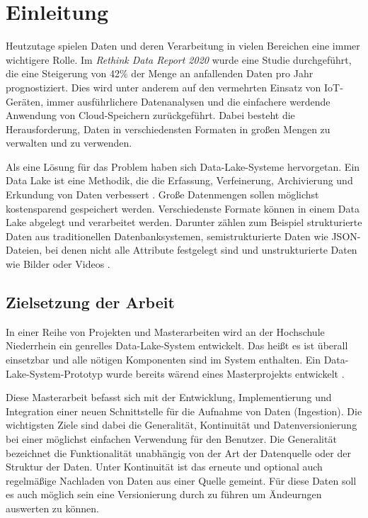 \chapter{Einleitung}

Heutzutage spielen Daten und deren Verarbeitung in vielen Bereichen eine immer wichtigere Rolle.
Im \textit{Rethink Data Report 2020} \textcite{rethink_data_2020} wurde eine Studie durchgeführt, die eine Steigerung von 42\% der Menge an anfallenden Daten pro Jahr prognostiziert.
Dies wird unter anderem auf den vermehrten Einsatz von IoT-Geräten, immer ausführlichere Datenanalysen und die einfachere werdende Anwendung von Cloud-Speichern zurückgeführt.
Dabei besteht die Herausforderung, Daten in verschiedensten Formaten in großen Mengen zu verwalten und zu verwenden.

Als eine Lösung für das Problem haben sich Data-Lake-Systeme hervorgetan.
Ein Data Lake ist eine Methodik, die die Erfassung, Verfeinerung, Archivierung und Erkundung von Daten verbessert \parencite{datalake_01}.
Große Datenmengen sollen möglichst kostensparend gespeichert werden.
Verschiedenste Formate können in einem Data Lake abgelegt und verarbeitet werden.
Darunter zählen zum Beispiel strukturierte Daten aus traditionellen Datenbanksystemen, semistrukturierte Daten wie JSON-Dateien, bei denen nicht alle Attribute festgelegt sind und unstrukturierte Daten wie Bilder oder Videos \parencite{datalake_02}.


\section{Zielsetzung der Arbeit}

In einer Reihe von Projekten und Masterarbeiten wird an der Hochschule Niederrhein ein genrelles Data-Lake-System entwickelt.
Das heißt es ist überall einsetzbar und alle nötigen Komponenten sind im System enthalten.
Ein Data-Lake-System-Prototyp wurde bereits wärend eines Masterprojekts entwickelt \parencite{prototyp}.

Diese Masterarbeit befasst sich mit der Entwicklung, Implementierung und Integration einer neuen Schnittstelle für die Aufnahme von Daten (Ingestion).
Die wichtigsten Ziele sind dabei die Generalität, Kontinuität und Datenversionierung bei einer möglichst einfachen Verwendung für den Benutzer.
Die Generalität bezeichnet die Funktionalität unabhängig von der Art der Datenquelle oder der Struktur der Daten.
Unter Kontinuität ist das erneute und optional auch regelmäßige Nachladen von Daten aus einer Quelle gemeint.
Für diese Daten soll es auch möglich sein eine Versionierung durch zu führen um Ändeurngen auswerten zu können.

